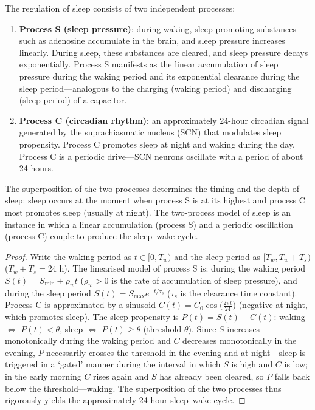 \begin{proposition}\label{prop:two_process_sleep}
The regulation of sleep consists of two independent processes:
\begin{enumerate}[label=(\roman*)]
    \item \textbf{Process S (sleep pressure)}: during waking, sleep-promoting substances such as adenosine accumulate in the brain, and sleep pressure increases linearly. During sleep, these substances are cleared, and sleep pressure decays exponentially. Process S manifests as the linear accumulation of sleep pressure during the waking period and its exponential clearance during the sleep period---analogous to the charging (waking period) and discharging (sleep period) of a capacitor.
    \item \textbf{Process C (circadian rhythm)}: an approximately 24-hour circadian signal generated by the suprachiasmatic nucleus (SCN) that modulates sleep propensity. Process C promotes sleep at night and waking during the day. Process C is a periodic drive---SCN neurons oscillate with a period of about 24 hours.
\end{enumerate}
The superposition of the two processes determines the timing and the depth of sleep: sleep occurs at the moment when process S is at its highest and process C most promotes sleep (usually at night). The two-process model of sleep is an instance in which a linear accumulation (process S) and a periodic oscillation (process C) couple to produce the sleep--wake cycle.
\end{proposition}

\begin{proof}
Write the waking period as $t \in [0, T_w)$ and the sleep period as $[T_w, T_w + T_s)$ ($T_w + T_s = 24$ h). The linearised model of process S is: during the waking period $S(t) = S_{\min} + \rho_w t$ ($\rho_w > 0$ is the rate of accumulation of sleep pressure), and during the sleep period $S(t) = S_{\max} e^{-t/\tau_s}$ ($\tau_s$ is the clearance time constant). Process C is approximated by a sinusoid $C(t) = C_0 \cos\!\big(\tfrac{2\pi t}{24}\big)$ (negative at night, which promotes sleep). The sleep propensity is $P(t) = S(t) - C(t)$: waking $\Leftrightarrow$ $P(t) < \theta$, sleep $\Leftrightarrow$ $P(t) \ge \theta$ (threshold $\theta$). Since $S$ increases monotonically during the waking period and $C$ decreases monotonically in the evening, $P$ necessarily crosses the threshold in the evening and at night---sleep is triggered in a `gated' manner during the interval in which $S$ is high and $C$ is low; in the early morning $C$ rises again and $S$ has already been cleared, so $P$ falls back below the threshold---waking. The superposition of the two processes thus rigorously yields the approximately 24-hour sleep--wake cycle.
\end{proof}

